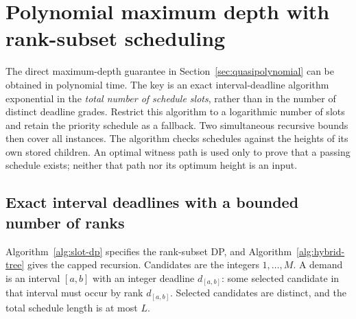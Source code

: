 \section{Polynomial maximum depth with rank-subset scheduling}
\label{sec:polynomial-slots}

The direct maximum-depth guarantee in
Section~\ref{sec:quasipolynomial} can be obtained in polynomial time.
The key is an exact interval-deadline algorithm exponential in the
\emph{total number of schedule slots}, rather than in the number of
distinct deadline grades. Restrict this algorithm to a logarithmic
number of slots and retain the priority schedule as a fallback.
Two simultaneous recursive bounds then cover all instances.
The algorithm checks schedules against the heights of its own stored
children. An optimal witness path is used only to prove that a passing
schedule exists; neither that path nor its optimum height is an input.

\subsection{Exact interval deadlines with a bounded number of ranks}

Algorithm~\ref{alg:slot-dp} specifies the rank-subset DP, and
Algorithm~\ref{alg:hybrid-tree} gives the capped recursion.
Candidates are the integers $1,\ldots,M$. A demand is an interval
$[a,b]$ with an integer deadline $d_{[a,b]}$: some selected candidate
in that interval must occur by rank $d_{[a,b]}$. Selected candidates
are distinct, and the total schedule length is at most $L$.

